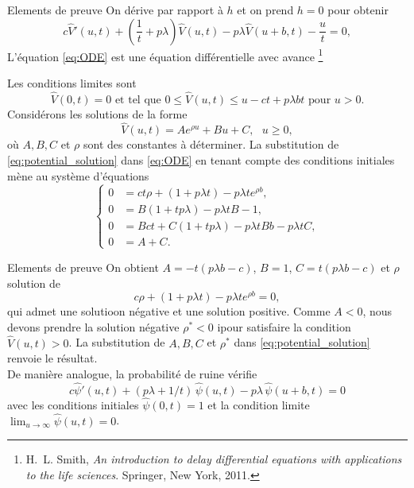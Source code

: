 \documentclass{beamer}
\newcommand\blfootnote[1]{%
  \begingroup
  \renewcommand\thefootnote{}\footnote{#1}%
  \addtocounter{footnote}{-1}%
  \endgroup
}
\begin{document}
\begin{frame}{Elements de preuve}
\scriptsize
On dérive par rapport à $h$ et on prend $h=0$ pour obtenir
\begin{equation}\label{eq:ODE}
c\widehat{V}'(u,t) + \left(\frac{1}{t} +  p\lambda\right)\widehat{V}(u,t) - p\lambda \widehat{V}(u+b,t) - \frac{u}{t} =0,
\end{equation}
L'équation \eqref{eq:ODE} est une équation différentielle avec avance
\blfootnote{\tiny 
 H.~L. Smith, {\em An introduction to delay differential equations with
  applications to the life sciences}.
\newblock Springer, New York, 2011.
}
Les conditions limites sont
$$
\widehat{V}(0,t) = 0 \text{ et tel que } 0\leq \widehat{V}(u,t)\leq u-ct+p\lambda b t \text{ pour }u>0.
$$  
Considérons les solutions de la forme 
\begin{equation}\label{eq:potential_solution}
\widehat{V}(u,t) = Ae^{\rho u }+Bu + C,\text{ }u \ge 0, 
\end{equation}
où $A, B,C$ et $\rho$ sont des constantes à déterminer. La substitution de  \eqref{eq:potential_solution} dans \eqref{eq:ODE} en tenant compte des conditions initiales mène au système d'équations
\begin{equation*}
\begin{cases}
0&=ct\rho + \left(1+p\lambda t\right)-p\lambda te^{\rho b}, \\
0&= B\left(1+tp\lambda\right)-p\lambda tB - 1,\\
0&=Bct+C(1+tp\lambda) - p\lambda t Bb-p\lambda tC, \\
0&=A+C.
\end{cases}
\end{equation*}
\end{frame}
\begin{frame}{Elements de preuve}
\scriptsize
On obtient $A = -t(p\lambda b - c)$, $B = 1$, $C = t(p\lambda b - c)$ et $\rho$ solution de
$$
c\rho + \left(1+p\lambda t\right)-p\lambda te^{\rho b} = 0,
$$
qui admet une solutioon négative et une solution positive. Comme $A<0$, nous devons prendre la solution négative  $\rho^\ast<0$ ipour satisfaire la condition $\widehat{V}(u,t)>0$. La substitution de $A,B,C$ et $\rho^{\ast}$ dans \eqref{eq:potential_solution} renvoie le résultat.\\

De manière analogue, la probabilité de ruine vérifie 
\begin{equation*}\label{psii}
c\widehat{\psi}'(u,t)+(p \lambda+1/t)\,\widehat{\psi}(u,t)-p \lambda\,\widehat{\psi}(u+b,t)=0
\end{equation*}
avec les conditions initiales $\widehat{\psi}(0,t)=1$ et la condition limite $\lim_{u\to\infty}\widehat{\psi}(u,t)=0$.
\end{frame}
\end{document}
